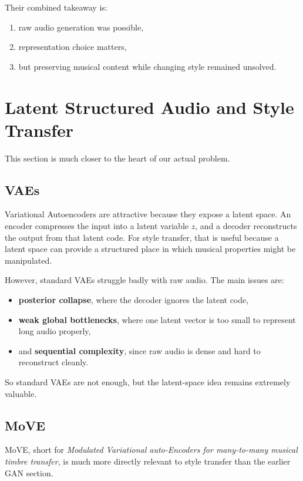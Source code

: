 \documentclass[11pt]{article}
\begin{document}
Their combined takeaway is:

\begin{enumerate}
\item raw audio generation was possible,
\item representation choice matters,
\item but preserving musical content while changing style remained unsolved.
\end{enumerate}

\section{Latent Structured Audio and Style Transfer}

This section is much closer to the heart of our actual problem.

\subsection{VAEs}

Variational Autoencoders are attractive because they expose a latent space. An encoder compresses the input into a latent variable \(z\), and a decoder reconstructs the output from that latent code. For style transfer, that is useful because a latent space can provide a structured place in which musical properties might be manipulated.

However, standard VAEs struggle badly with raw audio. The main issues are:

\begin{itemize}
\item \textbf{posterior collapse}, where the decoder ignores the latent code,
\item \textbf{weak global bottlenecks}, where one latent vector is too small to represent long audio properly,
\item and \textbf{sequential complexity}, since raw audio is dense and hard to reconstruct cleanly.
\end{itemize}

So standard VAEs are not enough, but the latent-space idea remains extremely valuable.

\subsection{MoVE}

MoVE, short for \emph{Modulated Variational auto-Encoders for many-to-many musical timbre transfer}, is much more directly relevant to style transfer than the earlier GAN section.
\end{document}
